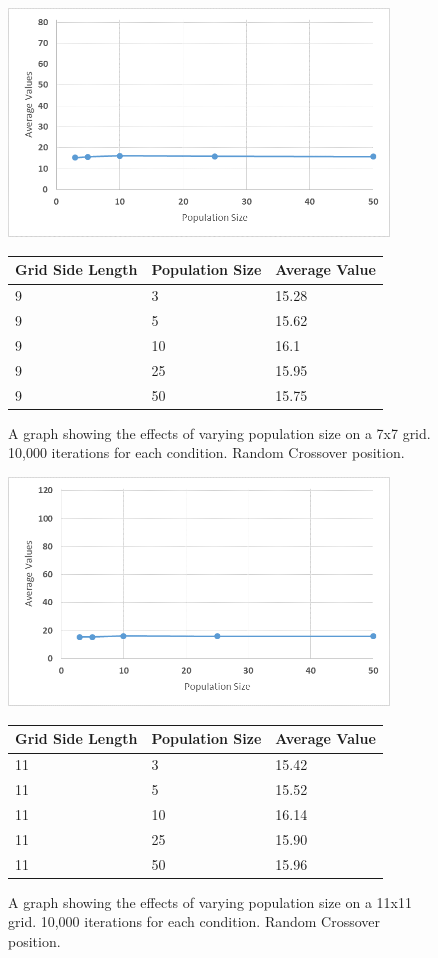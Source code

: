 \documentclass[12pt]{article}
\begin{document}
\begin{figure}[H]
    \centering
    \includegraphics[width=0.9\textwidth]{9x9_GA_pop}
\begin{tabular}{ |p{4cm}||p{4cm}|p{4cm}|  }
 \hline
Grid Side Length&Population Size&Average Value\\
 \hline
9&3&15.28\\
9&5&15.62\\
9&10&16.1\\
9&25&15.95\\
9&50&15.75\\
 \hline
\end{tabular}
    \caption{A graph showing the effects of varying population size on a 7x7 grid. 10,000 iterations for each condition. Random Crossover position.}
    \label{fig:GApop7x7}
\end{figure}

\begin{figure}[H]
    \centering
    \includegraphics[width=0.9\textwidth]{11x11_GA_pop}
\begin{tabular}{ |p{4cm}||p{4cm}|p{4cm}|  }
 \hline
Grid Side Length&Population Size&Average Value\\
 \hline
11&3&15.42\\
11&5&15.52\\
11&10&16.14\\
11&25&15.90\\
11&50&15.96\\
 \hline
\end{tabular}
    \caption{A graph showing the effects of varying population size on a 11x11 grid. 10,000 iterations for each condition. Random Crossover position.}
    \label{fig:GApop11x11}
\end{figure}
\end{document}
